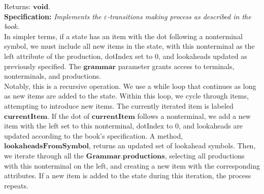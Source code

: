 Returns: \textit{\(\boldsymbol{void}\).}\\

\textbf{Specification:} \textit{Implements the \(\varepsilon\)-transitions making process as described in the book.}\\

In simpler terms, if a state has an item with the dot following a nonterminal symbol, we must include all new items in the state, with this nonterminal as the left attribute of the production, dotIndex set to 0, and lookaheads updated as previously specified. The \(\boldsymbol{grammar}\) parameter grants access to terminals, nonterminals, and productions.\\

Notably, this is a recursive operation. We use a while loop that continues as long as new items are added to the state. Within this loop, we cycle through items, attempting to introduce new items. The currently iterated item is labeled  \(\boldsymbol{currentItem}\). If the dot of \(\boldsymbol{currentItem}\) follows a nonterminal, we add a new item with the left set to this nonterminal, dotIndex to 0, and lookaheads are updated according to the book's specification. A method, \(\boldsymbol{lookaheadsFromSymbol}\), returns an updated set of lookahead symbols. Then, we iterate through all the \(\boldsymbol{Grammar.productions}\), selecting all productions with this nonterminal on the left, and creating a new item with the corresponding attributes. If a new item is added to the state during this iteration, the process repeats.\\

